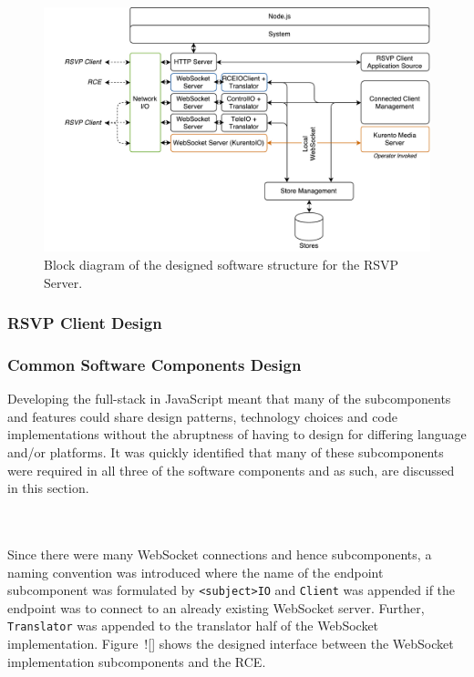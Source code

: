         \begin{figure}[h!]
          \centering
          \includegraphics[width=1\linewidth]{figures/softDesign-serverStructurePlan}
          \caption[Block diagram of the designed software structure for the RSVP Server.]{Block diagram of the designed software structure for the RSVP Server.}
          \label{fig:softDesign-serverStructurePlan}
        \end{figure}
        
        
      
      
    \subsubsection{RSVP Client Design}
    
    \subsubsection{Common Software Components Design}
    \label{subsec:commonSoftwareComponentDesign}
      Developing the full-stack in JavaScript meant that many of the subcomponents and features could share design patterns, technology choices and code implementations without the abruptness of having to design for differing language and/or platforms. It was quickly identified that many of these subcomponents were required in all three of the software components and as such, are discussed in this section.
      
      \\\\
        Since there were many WebSocket connections and hence subcomponents, a naming convention was introduced where the name of the endpoint subcomponent was formulated by \texttt{<subject>IO} and \texttt{Client} was appended if the endpoint was to connect to an already existing WebSocket server. Further, \texttt{Translator} was appended to the translator half of the WebSocket implementation. Figure~![] shows the designed interface between the WebSocket implementation subcomponents and the RCE.
      